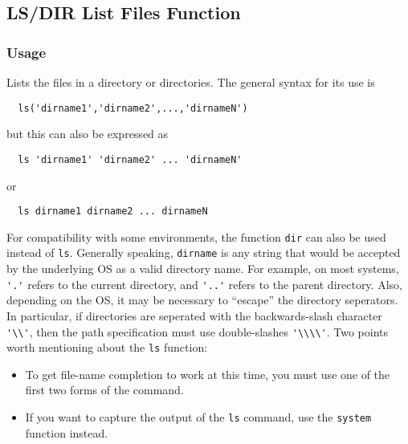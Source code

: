 %
%
%
\subsection{LS/DIR List Files Function}
\subsubsection{Usage}
Lists the files in a directory or directories.  The general syntax for its use is
\begin{verbatim}
  ls('dirname1','dirname2',...,'dirnameN')
\end{verbatim}
but this can also be expressed as
\begin{verbatim}
  ls 'dirname1' 'dirname2' ... 'dirnameN'
\end{verbatim}
or 
\begin{verbatim}
  ls dirname1 dirname2 ... dirnameN
\end{verbatim}
For compatibility with some environments, the function \verb|dir| can also be used instead of \verb|ls|.  Generally speaking, \verb|dirname| is any string that would be accepted by the underlying OS as a valid directory name.  For example, on most systems, \verb|'.'| refers to the current directory, and \verb|'..'| refers to the parent directory.  Also, depending on the OS, it may be necessary to ``escape'' the directory seperators.  In particular, if directories are seperated with the backwards-slash character \verb|'\\'|, then the path specification must use double-slashes \verb|'\\\\'|. Two points worth mentioning about the \verb|ls| function:
\begin{itemize}
  \item To get file-name completion to work at this time, you must use one of the first two forms of the command.
  \item If you want to capture the output of the \verb|ls| command, use the \verb|system| function instead.
\end{itemize}

